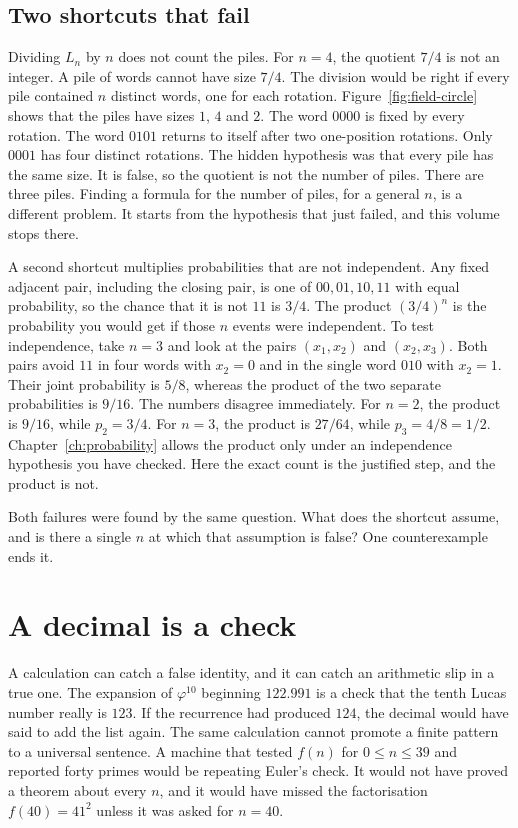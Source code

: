 \subsection*{Two shortcuts that fail}
Dividing $L_n$ by $n$ does not count the piles. For $n=4$, the quotient $7/4$ is not an integer. A pile of words cannot have size $7/4$. The division would be right if every pile contained $n$ distinct words, one for each rotation. Figure~\ref{fig:field-circle} shows that the piles have sizes $1$, $4$ and $2$. The word $0000$ is fixed by every rotation. The word $0101$ returns to itself after two one-position rotations. Only $0001$ has four distinct rotations. The hidden hypothesis was that every pile has the same size. It is false, so the quotient is not the number of piles. There are three piles. Finding a formula for the number of piles, for a general $n$, is a different problem. It starts from the hypothesis that just failed, and this volume stops there.

A second shortcut multiplies probabilities that are not independent. Any fixed adjacent pair, including the closing pair, is one of $00,01,10,11$ with equal probability, so the chance that it is not $11$ is $3/4$. The product $(3/4)^n$ is the probability you would get if those $n$ events were independent. To test independence, take $n=3$ and look at the pairs $(x_1,x_2)$ and $(x_2,x_3)$. Both pairs avoid $11$ in four words with $x_2=0$ and in the single word $010$ with $x_2=1$. Their joint probability is $5/8$, whereas the product of the two separate probabilities is $9/16$. The numbers disagree immediately. For $n=2$, the product is $9/16$, while $p_2=3/4$. For $n=3$, the product is $27/64$, while $p_3=4/8=1/2$. Chapter~\ref{ch:probability} allows the product only under an independence hypothesis you have checked. Here the exact count is the justified step, and the product is not.

Both failures were found by the same question. What does the shortcut assume, and is there a single $n$ at which that assumption is false? One counterexample ends it.

\section*{A decimal is a check}
A calculation can catch a false identity, and it can catch an arithmetic slip in a true one. The expansion of $\varphi^{10}$ beginning $122.991$ is a check that the tenth Lucas number really is $123$. If the recurrence had produced $124$, the decimal would have said to add the list again. The same calculation cannot promote a finite pattern to a universal sentence. A machine that tested $f(n)$ for $0\le n\le39$ and reported forty primes would be repeating Euler's check. It would not have proved a theorem about every $n$, and it would have missed the factorisation $f(40)=41^2$ unless it was asked for $n=40$.

